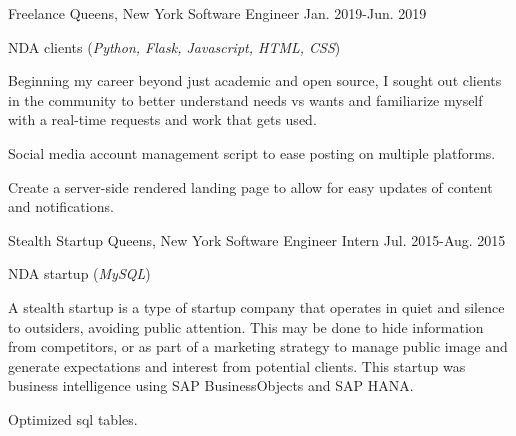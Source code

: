 \begin{cventries}
  \nrolecventrynoitems
    {Freelance} %
    {Queens, New York} %
    {Software Engineer} %
    {Jan. 2019-Jun. 2019} %
    {} %
    {} %
    {} %
    {} %

  \cvcustombodydescription
    {NDA clients (\emph{Python, Flask, Javascript, HTML, CSS})}
    {
      \begin{cvtightprose} %
        {Beginning my career beyond just academic and open source, I sought out clients in the community to better understand needs vs wants and familiarize myself with a real-time requests and work that gets used.}
      \end{cvtightprose}
    }
    {
      \begin{cvitems} %
        \item {Social media account management script to ease posting on multiple platforms.}
        \item {Create a server-side rendered landing page to allow for easy updates of content and notifications.}
      \end{cvitems}
    }

  \nrolecventrynoitems
    {Stealth Startup} %
    {Queens, New York} %
    {Software Engineer Intern} %
    {Jul. 2015-Aug. 2015} %
    {} %
    {} %
    {} %
    {} %

  \cvcustombodydescription
    {NDA startup (\emph{MySQL})}
    {
      \begin{cvtightprose} %
        {A stealth startup is a type of startup company that operates in quiet and silence to outsiders, avoiding public attention. This may be done to hide information from competitors, or as part of a marketing strategy to manage public image and generate expectations and interest from potential clients. This startup was business intelligence using SAP BusinessObjects and SAP HANA.}
      \end{cvtightprose}
    }
    {
      \begin{cvitems} %
        \item {Optimized sql tables.}
      \end{cvitems}
    }

\end{cventries}
